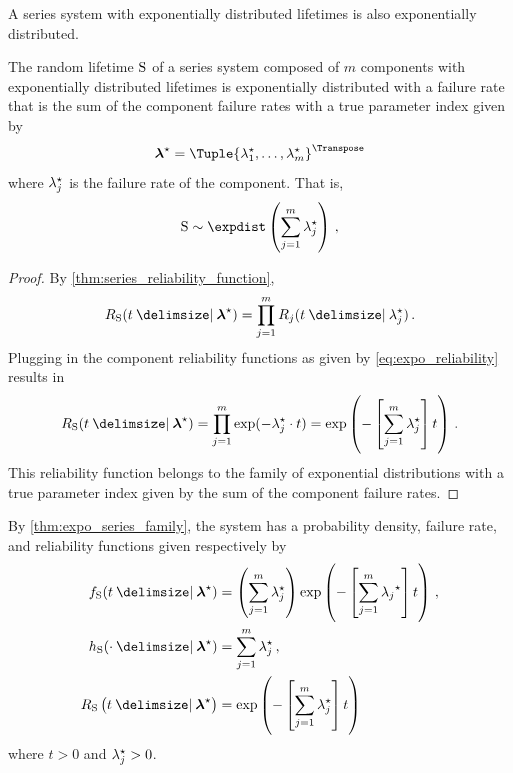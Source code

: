 \documentclass[
    11pt,
    extrafontsizes,
    article,
    oldfontcommands,
    final,
    oneside,
    openany,
    hidelinks]{memoir}
\begin{document}
A series system with exponentially distributed lifetimes is also 
exponentially distributed.
\begin{theorem}
\label{thm:expo_series_family}
The random lifetime $\mathrm{S}$ of a series system composed of $m$ components with 
exponentially distributed lifetimes is exponentially distributed with a failure 
rate that is the sum of the component failure rates with a true parameter index 
given by
\begin{equation}
    \tparam{\vec\lambda} = \Tuple{\tparam\lambda_1, \ldots, 
    \tparam\lambda_m}^{\Transpose}
\end{equation}
where ${\lambda}^{\star}_j$ is the failure rate of the \jth component. That is,
\begin{equation}
    \sv \sim \expdist \left(\sum_{j=1}^{m} \tparam{\lambda}_j\right)\,,
\end{equation}

\end{theorem}
\begin{proof}
By \cref{thm:series_reliability_function},
\begin{equation}
    \srv_{\sv}(t \Given \tparam{\vec\lambda}) = \prod_{j=1}^{m} \srv_j(t \Given 
    \tparam\lambda_j)\,.
\end{equation}
Plugging in the component reliability functions as given by 
\cref{eq:expo_reliability} results in
\begin{equation}
    \srv_{\sv}(t \Given \tparam{\vec\lambda}) = \prod_{j=1}^{m} 
    \exp(-\tparam\lambda_j \cdot t) =
    \exp \left(-\left [ \sum_{j=1}^{m}{\tparam\lambda_j} \right ] t\right)\,.
\end{equation}
This reliability function belongs to the family of exponential 
distributions with a true parameter index given by the sum of the component 
failure rates.
\end{proof}

By \cref{thm:expo_series_family}, the system has a probability density, 
failure rate, and reliability functions given respectively by
\begin{align}
\label{eq:expo_sys_pdf}
\spdf(t \Given \tparam{\vec\lambda}) &=
    \left ( \sum_{j=1}^{m} {\tparam{\lambda}_j} \right ) \exp
    \left(-\left [ \sum_{j=1}^{m}{\tparam{\lambda_j}} \right ] t\right)\,,\\
\label{eq:expo_sys_failure_rate}
\haz_{\sv}(\cdot \Given \tparam{\vec\lambda}) &=
    \sum_{j=1}^{m}{\tparam\lambda_j}\,,\\
\label{eq:sys_expo_reliability_function}
\srv_{\sv} \left(t \Given \tparam{\vec\lambda} \right) &=
    \exp \left(-\left [ \sum_{j=1}^{m}{\tparam\lambda_j} \right ] t\right)
\end{align}
where $t > 0$ and ${\lambda}^{\star}_j > 0$.
\end{document}
